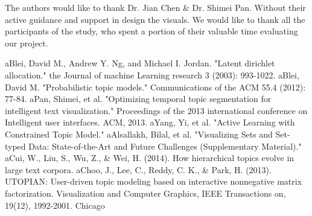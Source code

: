 \documentclass[10pt,journal,compsoc]{IEEEtran}
\begin{document}
The authors would like to thank Dr. Jian Chen \& Dr. Shimei Pan. Without their active guidance and support in design the visuals. We would like to thank all the participants of the study, who spent a portion of their valuable time evaluating our project.

\ifCLASSOPTIONcaptionsoff
  \newpage
\fi





%
%
%

\begin{thebibliography}{1}
\bibitem aBlei, David M., Andrew Y. Ng, and Michael I. Jordan. "Latent dirichlet allocation." the Journal of machine Learning research 3 (2003): 993-1022.
\bibitem aBlei, David M. "Probabilistic topic models." Communications of the ACM 55.4 (2012): 77-84.
\bibitem aPan, Shimei, et al. "Optimizing temporal topic segmentation for intelligent text visualization." Proceedings of the 2013 international conference on Intelligent user interfaces. ACM, 2013.
\bibitem aYang, Yi, et al. "Active Learning with Constrained Topic Model."
\bibitem aAlsallakh, Bilal, et al. "Visualizing Sets and Set-typed Data: State-of-the-Art and Future Challenges (Supplementary Material)."
\bibitem aCui, W., Liu, S., Wu, Z., \& Wei, H. (2014). How hierarchical topics evolve in large text corpora.
\bibitem aChoo, J., Lee, C., Reddy, C. K., \& Park, H. (2013). UTOPIAN: User-driven topic modeling based on interactive nonnegative matrix factorization. Visualization and Computer Graphics, IEEE Transactions on, 19(12), 1992-2001.
Chicago	

\end{thebibliography}
\end{document}
